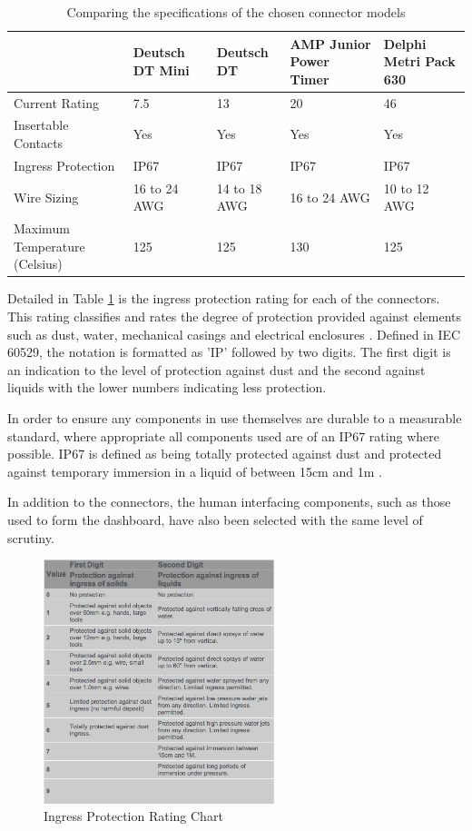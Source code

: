 \begin{table}
	\begin{tabular}{ | l | l | l | l | l | }
	\hline
		 & Deutsch DT Mini & Deutsch DT & AMP Junior Power Timer & Delphi Metri Pack 630 \\ \hline
		Current Rating & 7.5 & 13 & 20 & 46 \\ \hline
		Insertable Contacts & Yes & Yes & Yes & Yes \\ \hline
		Ingress Protection & IP67 & IP67 & IP67 & IP67 \\ \hline
		Wire Sizing & 16 to 24 AWG & 14 to 18 AWG & 16 to 24 AWG & 10 to 12 AWG \\ \hline
		Maximum Temperature (Celsius) & 125 & 125 & 130 & 125 \\ \hline
	\end{tabular}
	\caption{Comparing the specifications of the chosen connector models}
	\label{tab:connector_specs}
\end{table}

Detailed in Table \ref{tab:connector_specs} is the ingress protection rating for each of the connectors.  This rating classifies and rates the degree of protection provided against elements such as dust, water, mechanical casings and electrical enclosures\cite{ip_rating} . Defined in IEC 60529, the notation is formatted as 'IP' followed by two digits.  The first digit is an indication to the level of protection against dust and the second against liquids with the lower numbers indicating less protection.

In order to ensure any components in use themselves are durable to a measurable standard, where appropriate all components used are of an IP67 rating where possible.  IP67 is defined as being totally protected against dust and protected against temporary immersion in a liquid of between 15cm and 1m \cite{ip_rating}.

In addition to the connectors, the human interfacing components, such as those used to form the dashboard, have also been selected with the same level of scrutiny. 

\begin{figure}[h!]
	\centering
	\includegraphics[width=0.6\textwidth]{ip_ratings.png}
	\caption{Ingress Protection Rating Chart\cite{ip_chart}}
	\label{fig:IP_rating_chart}
\end{figure}

